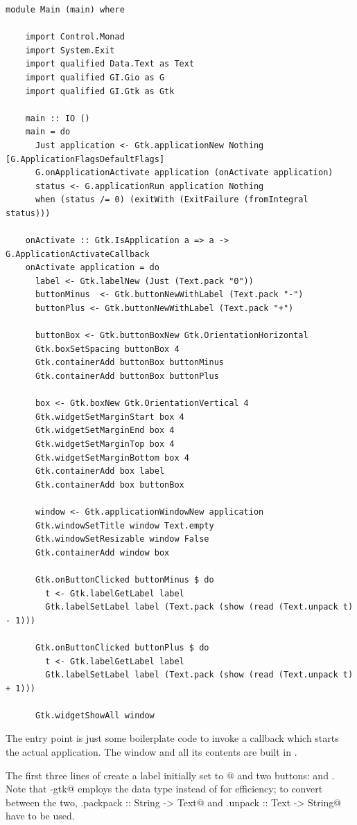 \documentclass[UdineBachThesis,american,11pt]{PhdThesis}
\begin{document}
  \begin{lstlisting}[gobble=4,basicstyle=\ttfamily\small]
    module Main (main) where

    import Control.Monad
    import System.Exit
    import qualified Data.Text as Text
    import qualified GI.Gio as G
    import qualified GI.Gtk as Gtk

    main :: IO ()
    main = do
      Just application <- Gtk.applicationNew Nothing [G.ApplicationFlagsDefaultFlags]
      G.onApplicationActivate application (onActivate application)
      status <- G.applicationRun application Nothing
      when (status /= 0) (exitWith (ExitFailure (fromIntegral status)))

    onActivate :: Gtk.IsApplication a => a -> G.ApplicationActivateCallback
    onActivate application = do
      label <- Gtk.labelNew (Just (Text.pack "0"))
      buttonMinus  <- Gtk.buttonNewWithLabel (Text.pack "-")
      buttonPlus <- Gtk.buttonNewWithLabel (Text.pack "+")

      buttonBox <- Gtk.buttonBoxNew Gtk.OrientationHorizontal
      Gtk.boxSetSpacing buttonBox 4
      Gtk.containerAdd buttonBox buttonMinus
      Gtk.containerAdd buttonBox buttonPlus

      box <- Gtk.boxNew Gtk.OrientationVertical 4
      Gtk.widgetSetMarginStart box 4
      Gtk.widgetSetMarginEnd box 4
      Gtk.widgetSetMarginTop box 4
      Gtk.widgetSetMarginBottom box 4
      Gtk.containerAdd box label
      Gtk.containerAdd box buttonBox

      window <- Gtk.applicationWindowNew application
      Gtk.windowSetTitle window Text.empty
      Gtk.windowSetResizable window False
      Gtk.containerAdd window box

      Gtk.onButtonClicked buttonMinus $ do
        t <- Gtk.labelGetLabel label
        Gtk.labelSetLabel label (Text.pack (show (read (Text.unpack t) - 1)))

      Gtk.onButtonClicked buttonPlus $ do
        t <- Gtk.labelGetLabel label
        Gtk.labelSetLabel label (Text.pack (show (read (Text.unpack t) + 1)))

      Gtk.widgetShowAll window
  \end{lstlisting}

  The entry point \lstinline@main@ is just some boilerplate code to invoke a
  callback which starts the actual application. The window and all its contents
  are built in \lstinline@onActivate@.

  \newpage

  The first three lines of \lstinline@onActivate@ create a label initially set
  to @ and two buttons: \lstinline@buttonMinus@ and
  \lstinline@buttonPlus@. Note that \lstinline@gi-gtk@ employs the
  \lstinline@Text@ data type instead of \lstinline@String@ for efficiency;
  to convert between the two, \lstinline@Text.packpack :: String -> Text@ and
  \lstinline@Text.unpack :: Text -> String@ have to be used.
\end{document}
